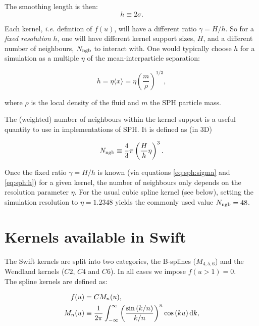 \documentclass[usenatbib, useAMS,a4paper]{mnras}
\newcommand{\swift}{{\sc Swift}\xspace}
\begin{document}
The smoothing length is then:
\begin{equation}
  h\equiv2\sigma.
    \label{eq:sph:h}
\end{equation}

Each kernel, {\it i.e.} defintion of $f(u)$, will have a different
ratio $\gamma = H/h$. So for a \emph{fixed resolution} $h$, one will
have different kernel support sizes, $H$, and a different number of
neighbours, $N_{\rm ngb}$ to interact with. One would typically choose
$h$ for a simulation as a multiple $\eta$ of the mean-interparticle
separation:

\begin{equation}
  h = \eta \langle x \rangle = \eta \left(\frac{m}{\rho}\right)^{1/3},
\end{equation}

where $\rho$ is the local density of the fluid and $m$ the SPH
particle mass. 

The (weighted) number of neighbours within the kernel support is a
useful quantity to use in implementations of SPH. It is defined as (in
3D)

\begin{equation}
  N_{\rm ngb} \equiv \frac{4}{3}\pi \left(\frac{H}{h}\eta\right)^3.
\end{equation}

Once the fixed ratio $\gamma= H/h$ is known (via equations
\ref{eq:sph:sigma} and \ref{eq:sph:h}) for a given kernel, the number
of neighbours only depends on the resolution parameter $\eta$.  For
the usual cubic spline kernel (see below), setting the simulation
resolution to $\eta=1.2348$ yields the commonly used value $N_{\rm
  ngb} = 48$.

\section{Kernels available in \swift}

The \swift kernels are split into two categories, the B-splines
($M_{4,5,6}$) and the Wendland kernels ($C2$, $C4$ and $C6$). In all
cases we impose $f(u>1) = 0$.\\

The spline kernels are defined as:

\begin{align}
  f(u) &= C M_n(u), \\
  M_n(u) &\equiv \frac{1}{2\pi}
  \int_{-\infty}^{\infty}
  \left(\frac{\sin\left(k/n\right)}{k/n}\right)^n\cos\left(ku\right){\rm
  d}k,
\end{align}
\end{document}
